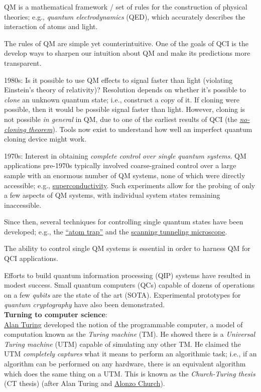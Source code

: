 \documentclass{article}
\numberwithin{equation}{section}
\begin{document}
QM is a mathematical framework / set of rules for the construction of physical theories; e.g., \textit{quantum electrodynamics} (QED), which accurately describes the interaction of atoms and light.

The rules of QM are simple yet counterintuitive. One of the goals of QCI is the develop ways to sharpen our intuition about QM and make its predictions more transparent.

1980s: Is it possible to use QM effects to signal faster than light (violating Einstein's theory of relativity)? Resolution depends on whether it's possible to \textit{clone} an unknown quantum state; i.e., construct a copy of it. If cloning were possible, then it would be possible signal faster than light. However, cloning is not possible \textit{in general} in QM, due to one of the earliest results of QCI (the \href{https://en.wikipedia.org/wiki/No-cloning_theorem}{\textit{no-cloning theorem}}). Tools now exist to understand how well an imperfect quantum cloning device might work.

1970s: Interest in obtaining \textit{complete control over single quantum systems}. QM applications pre-1970s typically involved coarse-grained control over a large sample with an enormous number of QM systems, none of which were directly accessible; e.g., \href{https://en.wikipedia.org/wiki/Superconductivity}{superconductivity}. Such experiments allow for the probing of only a few aspects of QM systems, with individual system states remaining inaccessible.

Since then, several techniques for controlling single quantum states have been developed; e.g., the \href{https://en.wikipedia.org/wiki/Magnetic_trap_(atoms)}{``atom trap''} and the \href{https://en.wikipedia.org/wiki/Scanning_tunneling_microscope}{scanning tunneling microscope}.

The ability to control single QM systems is essential in order to harness QM for QCI applications.

Efforts to build quantum information processing (QIP) systems have resulted in modest success. Small quantum computers (QCs) capable of dozens of operations on a few \textit{qubits} are the state of the art (SOTA). Experimental prototypes for \textit{quantum cryptography} have also been demonstrated. \\

\textbf{Turning to computer science}: \\

\href{https://en.wikipedia.org/wiki/Alan_Turing}{Alan Turing} developed the notion of the programmable computer, a model of computation known as the \textit{Turing machine} (TM). He showed there is a \textit{Universal Turing machine} (UTM) capable of simulating any other TM. He claimed the UTM \textit{completely captures} what it means to perform an algorithmic task; i.e., if an algorithm can be performed on any hardware, there is an equivalent algorithm which does the same thing on a UTM. This is known as the \textit{Church-Turing thesis} (CT thesis) (after Alan Turing and \href{https://en.wikipedia.org/wiki/Alonzo_Church}{Alonzo Church}).
\end{document}
